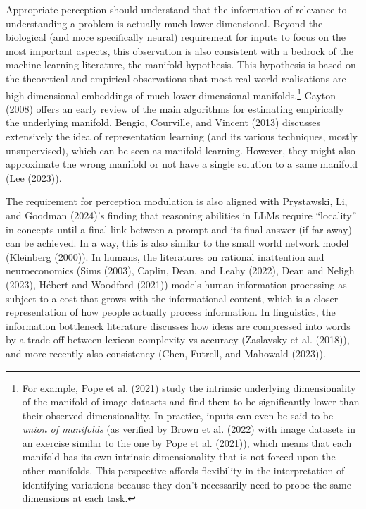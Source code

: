\documentclass[
]{article}
\begin{document}
Appropriate perception should understand that the information of
relevance to understanding a problem is actually much lower-dimensional.
Beyond the biological (and more specifically neural) requirement for
inputs to focus on the most important aspects, this observation is also
consistent with a bedrock of the machine learning literature, the
manifold hypothesis. This hypothesis is based on the theoretical and
empirical observations that most real-world realisations are
high-dimensional embeddings of much lower-dimensional
manifolds.\footnote{For example, Pope et al. (2021) study the intrinsic
  underlying dimensionality of the manifold of image datasets and find
  them to be significantly lower than their observed dimensionality. In
  practice, inputs can even be said to be \emph{union of manifolds} (as
  verified by Brown et al. (2022) with image datasets in an exercise
  similar to the one by Pope et al. (2021)), which means that each
  manifold has its own intrinsic dimensionality that is not forced upon
  the other manifolds. This perspective affords flexibility in the
  interpretation of identifying variations because they don't
  necessarily need to probe the same dimensions at each task.} Cayton
(2008) offers an early review of the main algorithms for estimating
empirically the underlying manifold. Bengio, Courville, and Vincent
(2013) discusses extensively the idea of representation learning (and
its various techniques, mostly unsupervised), which can be seen as
manifold learning. However, they might also approximate the wrong
manifold or not have a single solution to a same manifold (Lee (2023)).

The requirement for perception modulation is also aligned with
Prystawski, Li, and Goodman (2024)'s finding that reasoning abilities in
LLMs require ``locality'' in concepts until a final link between a
prompt and its final answer (if far away) can be achieved. In a way,
this is also similar to the small world network model (Kleinberg
(2000)). In humans, the literatures on rational inattention and
neuroeconomics (Sims (2003), Caplin, Dean, and Leahy (2022), Dean and
Neligh (2023), Hébert and Woodford (2021)) models human information
processing as subject to a cost that grows with the informational
content, which is a closer representation of how people actually process
information. In linguistics, the information bottleneck literature
discusses how ideas are compressed into words by a trade-off between
lexicon complexity vs accuracy (Zaslavsky et al. (2018)), and more
recently also consistency (Chen, Futrell, and Mahowald (2023)).
\end{document}
